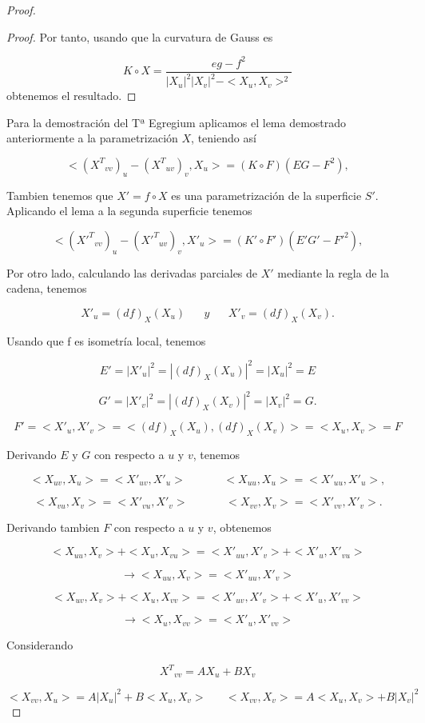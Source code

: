 \begin{proof}
\begin{proof}
		Por tanto, usando que la curvatura de Gauss es
		
		\[
			K \circ X = \frac{eg - f^2}{|X_u|^2|X_v|^2 - <X_u, X_v>^2}
		\]
		obtenemos el resultado.

	\end{proof}
	
	
	Para la demostración del Tª Egregium aplicamos el lema demostrado anteriormente a la parametrización $X$, teniendo así
	
	\[
		<({X^T}_{vv})_u - ({X^T}_{uv})_v, X_u> = (K \circ F)(EG - F^2),
	\]
	
	Tambien tenemos que $X' = f \circ X$ es una parametrización de la superficie $S'$. Aplicando el lema a la segunda superficie tenemos
	
	\[
		<({X'^T}_{vv})_u - ({X'^T}_{uv})_v, X'_u> = (K' \circ F')(E'G' - F'^2),
	\]
	
	Por otro lado, calculando las derivadas parciales de $X'$ mediante la regla de la cadena, tenemos
	
	\[
		X'_u = (df)_X(X_u) \;\;\;\;\;\; y \;\;\;\;\;\; X'_v = (df)_X(X_v).
	\]
	
	Usando que f es isometría local, tenemos
	
	\[
		E' = |X'_u|^2 = |(df)_X(X_u)|^2 = |X_u|^2 = E
	\]
	
	\[
		G' = |X'_v|^2 = |(df)_X(X_v)|^2 = |X_v|^2 = G.
	\]
	
	\[
		F' = <X'_u, X'_v> = <(df)_X(X_u), (df)_X(X_v)> = <X_u, X_v> = F
	\]
	
	Derivando $E$ y $G$ con respecto a $u$ y $v$, tenemos
	
	\[
		<X_{uv}, X_u> = <X'_{uv}, X'_u> \;\;\;\;\;\;  \;\;\;\;\;\; <X_{uu}, X_u> = <X'_{uu}, X'_u>,
	\]
	
	\[
		<X_{vu}, X_v> = <X'_{vu}, X'_v> \;\;\;\;\;\;  \;\;\;\;\;\; <X_{vv}, X_v> = <X'_{vv}, X'_v>.
	\]
	
	Derivando tambien $F$ con respecto a $u$ y $v$, obtenemos
	
	\[
		<X_{uu}, X_v> + <X_u, X_{vu}> = <X'_{uu}, X'_v> + <X'_u, X'_{vu}>
	\]
	
	\[
		\to <X_{uu}, X_v> = <X'_{uu}, X'_v>
	\]
	
	\[
		<X_{uv}, X_v> + <X_u, X_{vv}> = <X'_{uv}, X'_v> + <X'_u, X'_{vv}>
	\]
	
	\[
		\to <X_u, X_{vv}> = <X'_u, X'_{vv}>
	\]
	
	Considerando
	
	\[
		{X^T}_{vv} = AX_u + BX_v
	\]
	
	\[
		<X_{vv}, X_u> = A|X_u|^2 + B<X_u, X_v> \;\;\;\;\;\; <X_{vv}, X_v> = A<X_u, X_v> + B|X_v|^2
	\]
	

\end{proof}
